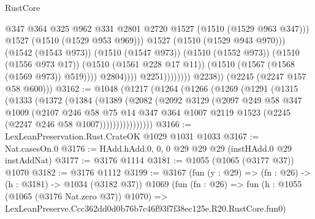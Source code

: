 \begin{lexlean}{RustCore}
\begin{coremodule}
                                            @347
                                            @364
                                            @325
                                            @962
                                            @331
                                            @2801
                                            @2720
                                            @1527
                                            (@1510 (@1529 @963 @347)))
                                          @1527
                                          (@1510 (@1529 @953 @969)))
                                        @1527
                                        (@1510 (@1529 @943 @970)))
                                      (@1542 (@1543 @973))
                                      (@1510 (@1547 @973))
                                      (@1510 (@1552 @973))
                                      (@1510 (@1556 @973 @17))
                                      (@1510 (@1561 @228 @17 @11))
                                      (@1510 (@1567 (@1568 (@1569 @973)) @519))))
                                  @2804))))
                          @2251))))))))
          @2238))
      (@2245 (@2247 @157 @58 @600)))
@3162 := @1048
    (@1217
      (@1264
        (@1266
          (@1269
            (@1291
              (@1315
                (@1333
                  (@1372
                    (@1384
                      (@1389
                        (@2082
                          (@2092
                            @3129
                            (@2097
                              @249
                              @58
                              @347
                              @1009
                              (@2107
                                @246
                                @58
                                @75
                                @14
                                @347
                                @364
                                @1007
                                @2119
                                @1523
                                (@2245 (@2247 @246 @58 @1007))))))))))))))))
@3166 := LexLeanPreservation.Rust.CrateOK @1029 @1031 @1033
@3167 := Nat.casesOn.{0}
@3176 := HAdd.hAdd.{0, 0, 0} @29 @29 @29 (instHAdd.{0} @29 instAddNat)
@3177 := @3176 @1114
@3181 := @1055 (@1065 (@3177 @37)) @1070
@3182 := @3176 @1112
@3199 := @3167
    (fun (y : @29) => (fn : @26) -> (h : @3181) -> @1034 (@3182 @37))
    @1069
    (fun (fn : @26) =>
    fun (h : @1055 (@1065 (@3176 Nat.zero @37)) @1070) =>
    LexLeanPreserve.Ccc362dd0d0b76b7c46f93f7f38ec125e.R20.RustCore.fun0)

\end{coremodule}
\end{lexlean}
